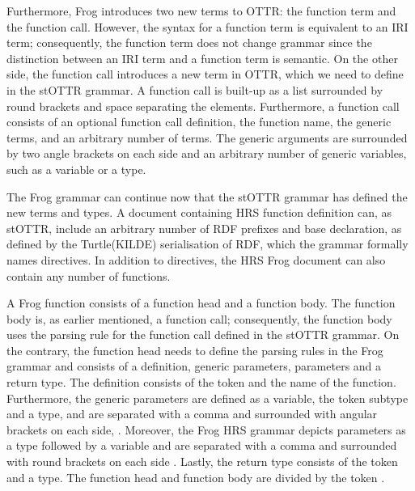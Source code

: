 \para
Furthermore, Frog introduces two new terms to OTTR: the function term and the function call. However, the syntax for a function term is equivalent to an IRI term; consequently, the function term does not change grammar since the distinction between an IRI term and a function term is semantic. On the other side, the function call introduces a new term in OTTR, which we need to define in the stOTTR grammar. A function call is built-up as a list surrounded by round brackets \backgroundText{( )} and space separating the elements. Furthermore, a function call consists of an optional function call definition, the function name, the generic terms, and an arbitrary number of terms. The generic arguments are surrounded by two angle brackets on each side \backgroundText{<< >>} and an arbitrary number of generic variables, such as a variable or a type.

\para



\para
The Frog grammar can continue now that the stOTTR grammar has defined the new terms and types. A document containing HRS function definition can, as stOTTR, include an arbitrary number of RDF prefixes and base declaration, as defined by the Turtle(KILDE) serialisation of RDF, which the grammar formally names directives. In addition to directives, the HRS Frog document can also contain any number of functions.  

\para


\para
A Frog function consists of a function head and a function body. The function body is, as earlier mentioned, a function call; consequently, the function body uses the parsing rule for the function call defined in the stOTTR grammar. On the contrary, the function head needs to define the parsing rules in the Frog grammar and consists of a definition, generic parameters, parameters and a return type. The definition consists of the token  and the name of the function. Furthermore, the generic parameters are defined as a variable, the token subtype and a type, and are separated with a comma and surrounded with angular brackets on each side, \backgroundText{<< >>}. Moreover, the Frog HRS grammar depicts parameters as a type followed by a variable and are separated with a comma and surrounded with round brackets on each side \backgroundText{( )}. Lastly, the return type consists of the token \backgroundText{->} and a type. The function head and function body are divided by the token \backgroundText{::}.

